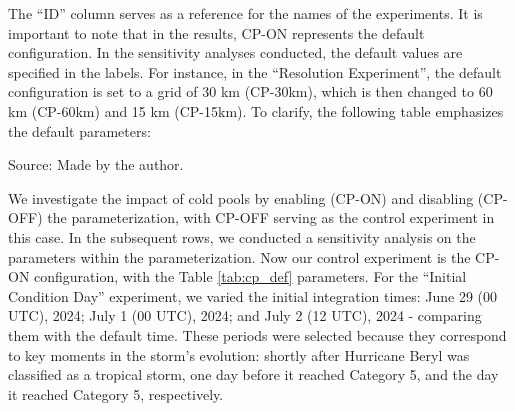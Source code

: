 The “ID” column serves as a reference for the names of the experiments. It is important to note that in the results, CP-ON represents the default configuration. In the sensitivity analyses conducted, the default values are specified in the labels. For instance, in the “Resolution Experiment”, the default configuration is set to a grid of 30 km (CP-30km), which is then changed to 60 km (CP-60km) and 15 km (CP-15km). To clarify, the following table emphasizes the default parameters:

\begin{table}[H]
	\centering
	\caption{Default values for the cold pool parameterization scheme.}
	\label{tab:cp_def}
	\renewcommand{\arraystretch}{1.2}
	
	\vspace{2mm}
	{\centering Source: Made by the author.\par}
\end{table}

We investigate the impact of cold pools by enabling (CP-ON) and disabling (CP-OFF) the parameterization, with CP-OFF serving as the control experiment in this case. In the subsequent rows, we conducted a sensitivity analysis on the parameters within the parameterization. Now our control experiment is the CP-ON configuration, with the Table \ref{tab:cp_def} parameters. For the “Initial Condition Day” experiment, we varied the initial integration times: June 29 (00 UTC), 2024; July 1 (00 UTC), 2024; and July 2 (12 UTC), 2024 - comparing them with the default time. These periods were selected because they correspond to key moments in the storm’s evolution: shortly after Hurricane Beryl was classified as a tropical storm, one day before it reached Category 5, and the day it reached Category 5, respectively.


